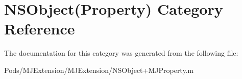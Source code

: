 \hypertarget{category_n_s_object_07_property_08}{}\section{N\+S\+Object(Property) Category Reference}
\label{category_n_s_object_07_property_08}


The documentation for this category was generated from the following file\+:\begin{DoxyCompactItemize}
\item 
Pods/\+M\+J\+Extension/\+M\+J\+Extension/N\+S\+Object+\+M\+J\+Property.\+m\end{DoxyCompactItemize}
